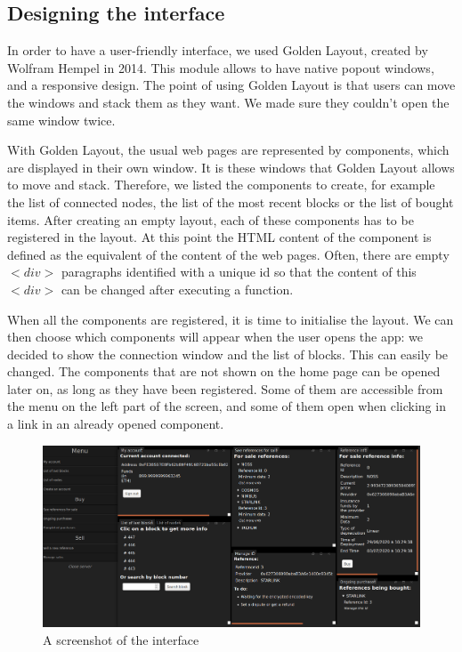 \documentclass[conference]{IEEEtran}
\begin{document}
\subsection{Designing the interface}
In order to have a user-friendly interface, we used Golden Layout\cite{GL}, created by Wolfram Hempel in 2014. This module allows to have native popout windows, and a responsive design. The point of using Golden Layout is that users can move the windows and stack them as they want. We made sure they couldn't open the same window twice.

With Golden Layout, the usual web pages are represented by components, which are displayed in their own window. It is these windows that Golden Layout allows to move and stack. Therefore, we listed the components to create, for example the list of connected nodes, the list of the most recent blocks or the list of bought items. After creating an empty layout, each of these components has to be registered in the layout. At this point the HTML content of the component is defined as the equivalent of the content of the web pages. Often, there are empty $<div>$ paragraphs identified with a unique id so that the content of this $<div>$ can be changed after executing a function.

When all the components are registered, it is time to initialise the layout. We can then choose which components will appear when the user opens the app: we decided to show the connection window and the list of blocks. This can easily be changed. The components that are not shown on the home page can be opened later on, as long as they have been registered. Some of them are accessible from the menu on the left part of the screen, and some of them open when clicking in a link in an already opened component.

\begin{figure}[ht]
\centering
\includegraphics[width=\linewidth]{screenshot.png}
 \caption{A screenshot of the interface}
 \label{fig:Screenshot}
\end{figure}
\end{document}
